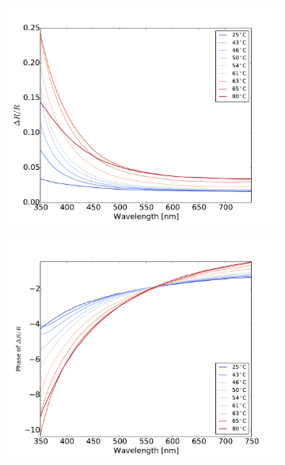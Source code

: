 \begin{figure}
    \centering
    \begin{subfigure}[b]{0.3\textwidth}
        \centering
        \includegraphics[width=\textwidth]{Results/Sim1/dR_visible.pdf}
        \caption{}
    \end{subfigure}
    \begin{subfigure}[b]{0.3\textwidth}
        \centering
        \includegraphics[width=\textwidth]{Results/Sim1/dRphase_visible.pdf}
        \caption{}
    \end{subfigure}

\end{figure}
